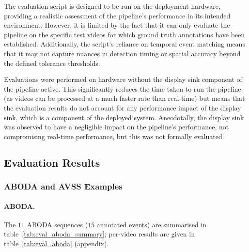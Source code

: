 The evaluation script is designed to be run on the deployment hardware,
providing a realistic assessment of the pipeline's performance in its intended
environment. However, it is limited by the fact that it can only evaluate the
pipeline on the specific test videos for which ground truth annotations have
been established. Additionally, the script's reliance on temporal event
matching means that it may not capture nuances in detection timing or spatial
accuracy beyond the defined tolerance thresholds.

Evaluations were performed on hardware without the display sink component of
the pipeline active. This significantly reduces the time taken to run the
pipeline (as videos can be processed at a much faster rate than real-time) but
means that the evaluation results do not account for any performance impact of
the display sink, which is a component of the deployed system. Anecdotally, the
display sink was observed to have a negligible impact on the pipeline's
performance, not compromising real-time performance, but this was not formally
evaluated.

\subsection{Evaluation Results}

\subsubsection[ABODA and AVSS Examples]{ABODA \protect\citep{lin2015aboda} and AVSS Examples}

\paragraph{ABODA.}

The $11$ ABODA sequences ($15$ annotated events) are summarised in
table~\ref{tab:eval_aboda_summary}; per-video results are given in
table~\ref{tab:eval_aboda} (appendix).

